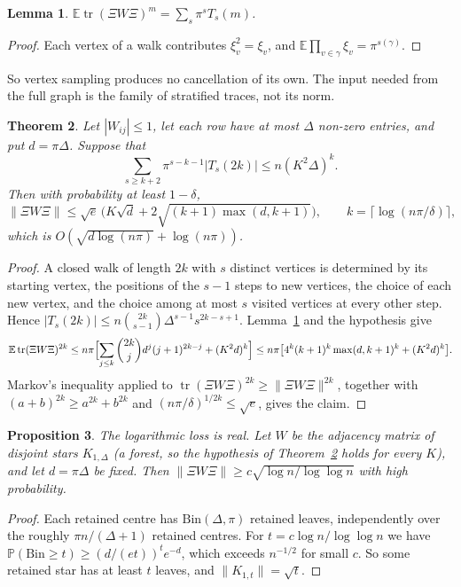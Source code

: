 \documentclass[11pt]{amsart}
\newtheorem{theorem}{Theorem}[section]
\newtheorem{lemma}[theorem]{Lemma}
\newtheorem{proposition}[theorem]{Proposition}
\theoremstyle{definition}
\theoremstyle{remark}
\newcommand{\E}{\mathbb{E}}
\newcommand{\tr}{\operatorname{tr}}
\begin{document}
\begin{lemma}\label{lem:sampling}
$\E\tr(\Xi W\Xi)^m=\sum_s\pi^sT_s(m)$.
\end{lemma}
\begin{proof}
Each vertex of a walk contributes $\xi_v^2=\xi_v$, and $\E\prod_{v\in\gamma}\xi_v=\pi^{s(\gamma)}$.
\end{proof}

So vertex sampling produces no cancellation of its own. The input needed from the full graph is the family of stratified traces, not its norm.

\begin{theorem}\label{thm:trace}
Let $|W_{ij}|\le1$, let each row have at most $\Delta$ non-zero entries, and put $d=\pi\Delta$. Suppose that
\[
\textstyle\sum_{s\ge k+2}\pi^{s-k-1}|T_s(2k)|\le n(K^2\Delta)^k .
\]
Then with probability at least $1-\delta$,
\[
\|\Xi W\Xi\|\le\sqrt e\,\bigl(K\sqrt d+2\sqrt{(k+1)\max(d,k+1)}\bigr),\qquad k=\lceil\log(n\pi/\delta)\rceil,
\]
which is $O(\sqrt{d\log(n\pi)}+\log(n\pi))$.
\end{theorem}
\begin{proof}
A closed walk of length $2k$ with $s$ distinct vertices is determined by its starting vertex, the positions of the $s-1$ steps to new vertices, the choice of each new vertex, and the choice among at most $s$ visited vertices at every other step. Hence $|T_s(2k)|\le n\binom{2k}{s-1}\Delta^{s-1}s^{2k-s+1}$. Lemma~\ref{lem:sampling} and the hypothesis give
\[
\E\tr(\Xi W\Xi)^{2k}\le n\pi\Bigl[\sum_{j\le k}\binom{2k}j d^j(j+1)^{2k-j}+(K^2d)^k\Bigr]\le n\pi\bigl[4^k(k+1)^k\max(d,k+1)^k+(K^2d)^k\bigr].
\]
Markov's inequality applied to $\tr(\Xi W\Xi)^{2k}\ge\|\Xi W\Xi\|^{2k}$, together with $(a+b)^{2k}\ge a^{2k}+b^{2k}$ and $(n\pi/\delta)^{1/2k}\le\sqrt e$, gives the claim.
\end{proof}

\begin{proposition}\label{prop:stars}
The logarithmic loss is real. Let $W$ be the adjacency matrix of disjoint stars $K_{1,\Delta}$ (a forest, so the hypothesis of Theorem~\ref{thm:trace} holds for every $K$), and let $d=\pi\Delta$ be fixed. Then $\|\Xi W\Xi\|\ge c\sqrt{\log n/\log\log n}$ with high probability.
\end{proposition}
\begin{proof}
Each retained centre has $\mathrm{Bin}(\Delta,\pi)$ retained leaves, independently over the roughly $\pi n/(\Delta+1)$ retained centres. For $t=c\log n/\log\log n$ we have $\mathbb P(\mathrm{Bin}\ge t)\ge(d/(et))^te^{-d}$, which exceeds $n^{-1/2}$ for small $c$. So some retained star has at least $t$ leaves, and $\|K_{1,t}\|=\sqrt t$.
\end{proof}
\end{document}
